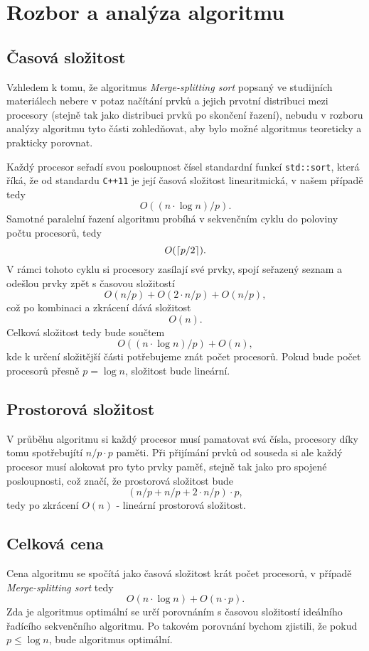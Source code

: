 \documentclass[12pt]{article}
\DeclarePairedDelimiter{\ceil}{\lceil}{\rceil}
\begin{document}
\section{Rozbor a analýza algoritmu}

\subsection{Časová složitost}

Vzhledem k tomu, že algoritmus \textit{Merge-splitting sort} popsaný ve studijních materiálech nebere v potaz načítání prvků a jejich prvotní distribuci mezi procesory (stejně tak jako distribuci prvků po skončení řazení), nebudu v rozboru analýzy algoritmu tyto části zohledňovat, aby bylo možné algoritmus teoreticky a prakticky porovnat.

Každý procesor seřadí svou posloupnost čísel standardní funkcí \verb|std::sort|, která říká, že od standardu \verb|C++11| je její časová složitost linearitmická, v našem případě tedy
$$ O((n \cdot \log n)/p). $$
Samotné paralelní řazení algoritmu probíhá v sekvenčním cyklu do poloviny počtu procesorů, tedy
$$ O(\ceil*{p/2}). $$
V rámci tohoto cyklu si procesory zasílají své prvky, spojí seřazený seznam a odešlou prvky zpět s časovou složitostí 
$$ O(n/p) + O(2 \cdot n/p) + O(n/p), $$
což po kombinaci a zkrácení dává složitost 
$$ O(n). $$
Celková složitost tedy bude součtem 
$$ O((n \cdot \log n)/p) + O(n),$$
kde k určení složitější části potřebujeme znát počet procesorů. Pokud bude počet procesorů přesně $p = \log n$, složitost bude lineární.

\subsection{Prostorová složitost}
V průběhu algoritmu si každý procesor musí pamatovat svá čísla, procesory díky tomu spotřebujítí $n/p \cdot p$ paměti. Při přijímání prvků od souseda si ale každý procesor musí alokovat pro tyto prvky paměť, stejně tak jako pro spojené posloupnosti, což značí, že prostorová složitost bude
$$ (n/p + n/p + 2 \cdot n/p) \cdot p, $$
tedy po zkrácení $O(n)$ - lineární prostorová složitost.

\subsection{Celková cena}

Cena algoritmu se spočítá jako časová složitost krát počet procesorů, v případě \textit{Merge-splitting sort} tedy
$$ O(n \cdot \log n) + O(n \cdot p). $$
Zda je algoritmus optimální se určí porovnáním s časovou složitostí ideálního řadícího sekvenčního algoritmu. Po takovém porovnání bychom zjistili, že pokud $ p \leq \log n $, bude algoritmus optimální.
\end{document}

